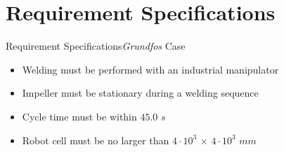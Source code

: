 \section{Requirement Specifications}
\begin{frame}{Requirement Specifications}{\textit{Grundfos} Case}
\begin{itemize}
    \item Welding must be performed with an industrial manipulator
    \item Impeller must be stationary during a welding sequence
    \item Cycle time must be within $45.0$ $s$
    \item Robot cell must be no larger than $4\cdot10^{3}$ $\times$ $4\cdot10^{3}$ $mm$
\end{itemize}
\vspace{5mm}
\end{frame}

